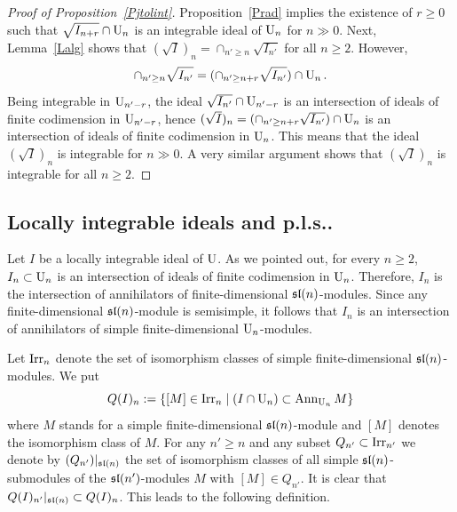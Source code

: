 \documentclass[10pt]{amsart}\oddsidemargin -1mm \evensidemargin -1mm \topmargin -15mm\headheight5mm \headsep 3.5mm \textheight 245mm\textwidth 170mm %
\begin{document}
\begin{proof}[Proof of Proposition~\ref{Pjtolint}] Proposition~\ref{Prad} implies the existence of $r\ge0$ such that
$\sqrt{I_{n+r}}\cap\operatorname{\mathrm{U}}_{n}$ is an integrable ideal of $\operatorname{\mathrm{U}}_{n}$ for $n\gg0$.
 Next, Lemma~\ref{Lalg} shows that $(\sqrt I)_{n}=\cap_{n'\ge n}\sqrt{I_{n'}}$ for all $n\ge2$. However, $$\cap_{n'\ge n}\sqrt{I_{n'}}=(\cap_{n'\ge n+r}\sqrt{I_{n'}})\cap\operatorname{\mathrm{U}}_n.$$
Being integrable in $\operatorname{\mathrm{U}}_{n'-r}$, the ideal $\sqrt{I_{n'}}\cap\operatorname{\mathrm{U}}_{n'-r}$ is an intersection of ideals of finite codimension in $\operatorname{\mathrm{U}}_{n'-r}$, hence $(\sqrt I)_n=(\cap_{n'\ge n+r}\sqrt{I_{n'}})\cap\operatorname{\mathrm{U}}_n$ is an intersection of ideals of finite codimension in $\operatorname{\mathrm{U}}_n$. This means that the ideal $(\sqrt I)_n$ is integrable for $n\gg 0$. A very similar argument shows that $(\sqrt I)_n$ is integrable for all $n\ge 2$. 
\end{proof}

\subsection{Locally integrable ideals and p.l.s..}\label{SSprt2} Let $I$ be a locally integrable  ideal of $\operatorname{\mathrm{U}}$. As we pointed out, for every $n\ge2$, $I_n\subset\operatorname{\mathrm{U}}_n$ is an intersection of ideals of finite codimension in $\operatorname{\mathrm{U}}_n$. Therefore, $I_n$ is the intersection of annihilators of finite-dimensional $\frak{sl}(n)$-modules. Since any finite-dimensional $\frak{sl}(n)$-module is semisimple, it follows that $I_n$ is an intersection of annihilators of simple finite-dimensional $\operatorname{\mathrm{U}}_n$-modules.

Let $\operatorname{\mathrm{Irr}}_n$ denote the set of isomorphism classes of simple finite-dimensional $\frak{sl}(n)$-modules. We put $$Q(I)_n:=\{[M]\in\operatorname{\mathrm{Irr}}_n\mid (I\cap\operatorname{\mathrm{U}}_n)\subset\operatorname{\mathrm{Ann}}_{\operatorname{\mathrm{U}}_n}M\}$$
where $M$ stands for a simple finite-dimensional $\frak{sl}(n)$-module and $[M]$ denotes the isomorphism class of $M$. For any $n'\ge n$ and any subset $Q_{n'}\subset\operatorname{\mathrm{Irr}}_{n'}$ we denote by $(Q_{n'})|_{\frak{sl}(n)}$ the set of isomorphism classes of all simple $\frak{sl}(n)$-submodules of the $\frak{sl}(n')$-modules $M$ with $[M]\in Q_{n'}$. It is clear that $Q(I)_{n'}|_{\frak{sl}(n)}\subset Q(I)_n$. This leads to the following definition.
\end{document}
